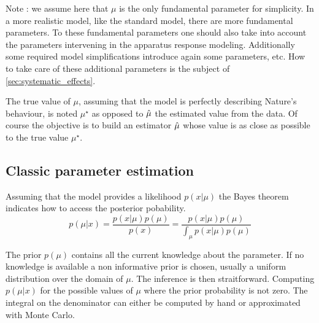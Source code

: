 Note : we assume here that $\mu$ is the only fundamental parameter for simplicity.
In a more realistic model, like the standard model, there are more fundamental parameters.
To these fundamental parameters one should also take into account the parameters intervening in the apparatus response modeling.
Additionally some required model simplifications introduce again some parameters, etc.
How to take care of these additional parameters is the subject of \autoref{sec:systematic_effects}.

The true value of $\mu$, assuming that the model is perfectly describing Nature's behaviour, is noted $\mu^\star$ as opposed to $\hat\mu$ the estimated value from the data.
Of course the objective is to build an estimator $\hat\mu$ whose value is as close as possible to the true value $\mu^\star$.







\subsection{Classic parameter estimation} %
\label{sub:classic_parameter_estimation}




Assuming that the model provides a likelihood $p(x | \mu)$ the Bayes theorem indicates how to access the posterior pobability.
\begin{equation}	
    p(\mu | x) = \frac{p(x|\mu) p(\mu)}{p(x)} = \frac{p(x|\mu) p(\mu)}{\int_\mu p(x|\mu) p(\mu)}
\end{equation}

The prior $p(\mu)$ contains all the current knowledge about the parameter. 
If no knowledge is available a non informative prior is chosen, usually a uniform distribution over the domain of $\mu$.
The inference is then straitforward.
Computing $p(\mu | x)$ for the possible values of $\mu$ \ie where the prior probability is not zero.
The integral on the denominator can either be computed by hand or approximated with Monte Carlo.

